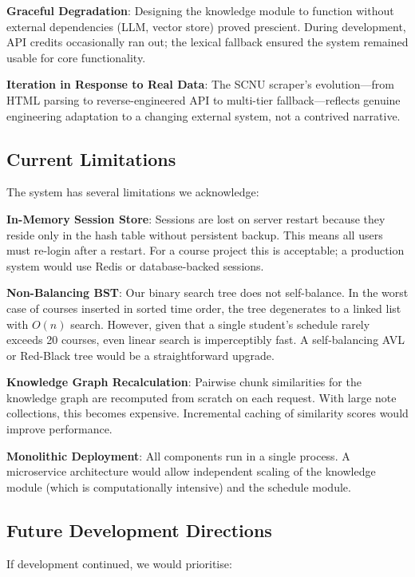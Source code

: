 \documentclass[11pt,a4paper]{article}
\begin{document}
\textbf{Graceful Degradation}: Designing the knowledge module to function without external dependencies (LLM, vector store) proved prescient. During development, API credits occasionally ran out; the lexical fallback ensured the system remained usable for core functionality.

\textbf{Iteration in Response to Real Data}: The SCNU scraper's evolution---from HTML parsing to reverse-engineered API to multi-tier fallback---reflects genuine engineering adaptation to a changing external system, not a contrived narrative.

\subsection{Current Limitations}
The system has several limitations we acknowledge:

\textbf{In-Memory Session Store}: Sessions are lost on server restart because they reside only in the hash table without persistent backup. This means all users must re-login after a restart. For a course project this is acceptable; a production system would use Redis or database-backed sessions.

\textbf{Non-Balancing BST}: Our binary search tree does not self-balance. In the worst case of courses inserted in sorted time order, the tree degenerates to a linked list with $O(n)$ search. However, given that a single student's schedule rarely exceeds 20 courses, even linear search is imperceptibly fast. A self-balancing AVL or Red-Black tree would be a straightforward upgrade.

\textbf{Knowledge Graph Recalculation}: Pairwise chunk similarities for the knowledge graph are recomputed from scratch on each request. With large note collections, this becomes expensive. Incremental caching of similarity scores would improve performance.

\textbf{Monolithic Deployment}: All components run in a single process. A microservice architecture would allow independent scaling of the knowledge module (which is computationally intensive) and the schedule module.

\subsection{Future Development Directions}
If development continued, we would prioritise:
\end{document}
